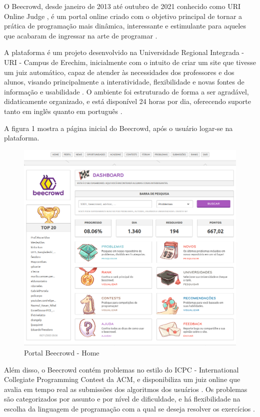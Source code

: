 O Beecrowd, desde janeiro de 2013 até outubro de 2021 conhecido como URI Online Judge \cite[p.~5]{piekarski}, é um portal online criado com o objetivo principal de tornar a prática de programação mais dinâmica, interessante e estimulante para aqueles que acabaram de ingressar na arte de programar \cite[p.~1]{beztonin2012}.

A plataforma é um projeto desenvolvido na Universidade Regional Integrada - URI - Campus de Erechim, inicialmente com o intuito de criar um site que tivesse um juiz automático, capaz de atender às necessidades dos professores e dos alunos, visando principalmente a interatividade, flexibilidade e novas fontes de informação e usabilidade \cite[p.~1]{beztonin2012}. O ambiente foi estruturado de forma a ser agradável, didaticamente organizado, e está disponível 24 horas por dia, oferecendo suporte tanto em inglês quanto em português \cite[p.~239]{beztonin2014}. 

A figura 1 mostra a página inicial do Beecrowd, após o usuário logar-se na plataforma.

\begin{figure}[h!]
	   \centering
            \caption{Portal Beecrowd - Home}
            \label{fig:BeecrowdHome}
	   	\includegraphics[scale=0.3]{pictures/beecrowd_home.png}
\end{figure}

Além disso, o Beecrowd contém problemas no estilo do ICPC - International Collegiate Programming Contest da ACM, e disponibiliza um juiz online que avalia em tempo real as submissões dos algoritmos dos usuários \cite[p.~350]{berssanettefrancisco}. Os problemas são categorizados por assunto e por nível de dificuldade, e há flexibilidade na escolha da linguagem de programação com a qual se deseja resolver os exercícios \cite[p.~1]{beztonin2012}.

